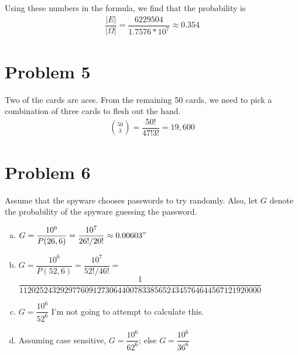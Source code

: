 \documentclass[11pt]{article}
\begin{document}
Using these numbers in the formula, we find that the probability is
	\begin{align*}
		\dfrac{|E|}{|\Omega|} = \dfrac{6229504}{1.7576 * 10^7} \approx 0 .354
	\end{align*}


\section*{Problem 5}
Two of the cards are aces. From the remaining 50 cards, we need to pick a combination of three cards to flesh out the hand.
\begin{align*}
	\binom{50}{3} = \dfrac{50!}{47!3!} =19,600
\end{align*}


\section*{Problem 6}
Assume that the spyware chooses passwords to try randomly. Also, let $G$ denote the probability of the spyware guessing the password.

\begin{enumerate}[(a)]
	\item $G = \dfrac{10^6}{P(26, 6)} = \dfrac{10^7}{26!/20!} \approx 0.00603"$
	\item $G = \dfrac{10^6}{P(52, 6)} = \dfrac{10^7}{52!/46!} =$\\
	$\dfrac{1}{11202524329297760912730644007833856524345764644567121920000}$
	\item $G = \dfrac{10^6}{52^6}$ I'm not going to attempt to calculate this.
	\item Assuming case sensitive, $G = \dfrac{10^6}{62^6}$; else $G = \dfrac{10^6}{36^6}$

	
\end{enumerate}
\end{document}
